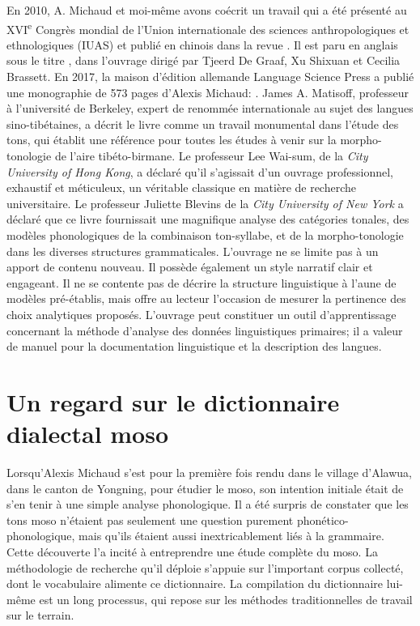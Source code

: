En 2010, A. Michaud et moi-même avons coécrit un travail qui a été présenté au XVI\textsuperscript{e} Congrès mondial de l'Union internationale des sciences anthropologiques et ethnologiques (IUAS) et publié en chinois dans la revue . Il est paru en anglais sous le titre , dans l’ouvrage  dirigé par Tjeerd De Graaf, Xu Shixuan et Cecilia Brassett. En 2017, la maison d'édition allemande Language Science Press a publié une monographie de 573 pages d’Alexis Michaud: \emph{}. James A. Matisoff, professeur à l'université de Berkeley, expert de renommée internationale au sujet des langues sino-tibétaines, a décrit le livre comme un travail monumental dans l'étude des tons, qui établit une référence pour toutes les études à venir sur la morpho-tonologie de l’aire tibéto-birmane. Le professeur Lee Wai-sum, de la \emph{City University of Hong Kong}, a déclaré qu'il s'agissait d'un ouvrage professionnel, exhaustif et méticuleux, un véritable classique en matière de recherche universitaire. Le professeur Juliette Blevins de la \emph{City University of New York} a déclaré que ce livre fournissait une magnifique analyse des catégories tonales, des modèles phonologiques de la combinaison ton-syllabe, et de la morpho-tonologie dans les diverses structures grammaticales. L’ouvrage ne se limite pas à un apport de contenu nouveau. Il possède également un style narratif clair et engageant. Il ne se contente pas de décrire la structure linguistique à l’aune de modèles pré-établis, mais offre au lecteur l’occasion de mesurer la pertinence des choix analytiques proposés. L'ouvrage peut constituer un outil d'apprentissage concernant la méthode d’analyse des données linguistiques primaires; il a valeur de manuel pour la documentation linguistique et la description des langues.

\section*{Un regard sur le dictionnaire dialectal moso}

Lorsqu’Alexis Michaud s'est pour la première fois rendu dans le village d'Alawua, dans le canton de Yongning, pour étudier le moso, son intention initiale était de s’en tenir à une simple analyse phonologique. Il a été surpris de constater que les tons moso n'étaient pas seulement une question purement phonético-phonologique, mais qu'ils étaient aussi inextricablement liés à la grammaire. Cette découverte l'a incité à entreprendre une étude complète du moso. La méthodologie de recherche qu’il déploie s’appuie sur l’important corpus collecté, dont le vocabulaire alimente ce dictionnaire. La compilation du dictionnaire lui-même est un long processus, qui repose sur les méthodes traditionnelles de travail sur le terrain.

